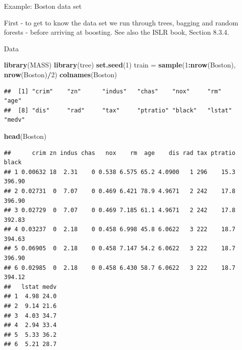 \documentclass[10pt,ignorenonframetext,]{beamer}
\newenvironment{Shaded}{\begin{snugshade}}{\end{snugshade}}
\newcommand{\KeywordTok}[1]{\textcolor[rgb]{0.13,0.29,0.53}{\textbf{#1}}}
\newcommand{\DecValTok}[1]{\textcolor[rgb]{0.00,0.00,0.81}{#1}}
\newcommand{\StringTok}[1]{\textcolor[rgb]{0.31,0.60,0.02}{#1}}
\newcommand{\OperatorTok}[1]{\textcolor[rgb]{0.81,0.36,0.00}{\textbf{#1}}}
\newcommand{\NormalTok}[1]{#1}
\begin{document}
\begin{frame}[fragile]{Example: Boston data set}

First - to get to know the data set we run through trees, bagging and
random forests - before arriving at boosting. See also the ISLR book,
Section 8.3.4.

\begin{block}{Data}

\begin{Shaded}
\begin{Highlighting}[]
\KeywordTok{library}\NormalTok{(MASS)}
\KeywordTok{library}\NormalTok{(tree)}
\KeywordTok{set.seed}\NormalTok{(}\DecValTok{1}\NormalTok{)}
\NormalTok{train =}\StringTok{ }\KeywordTok{sample}\NormalTok{(}\DecValTok{1}\OperatorTok{:}\KeywordTok{nrow}\NormalTok{(Boston), }\KeywordTok{nrow}\NormalTok{(Boston)}\OperatorTok{/}\DecValTok{2}\NormalTok{)}
\KeywordTok{colnames}\NormalTok{(Boston)}
\end{Highlighting}
\end{Shaded}

\begin{verbatim}
##  [1] "crim"    "zn"      "indus"   "chas"    "nox"     "rm"      "age"    
##  [8] "dis"     "rad"     "tax"     "ptratio" "black"   "lstat"   "medv"
\end{verbatim}

\begin{Shaded}
\begin{Highlighting}[]
\KeywordTok{head}\NormalTok{(Boston)}
\end{Highlighting}
\end{Shaded}

\begin{verbatim}
##      crim zn indus chas   nox    rm  age    dis rad tax ptratio  black
## 1 0.00632 18  2.31    0 0.538 6.575 65.2 4.0900   1 296    15.3 396.90
## 2 0.02731  0  7.07    0 0.469 6.421 78.9 4.9671   2 242    17.8 396.90
## 3 0.02729  0  7.07    0 0.469 7.185 61.1 4.9671   2 242    17.8 392.83
## 4 0.03237  0  2.18    0 0.458 6.998 45.8 6.0622   3 222    18.7 394.63
## 5 0.06905  0  2.18    0 0.458 7.147 54.2 6.0622   3 222    18.7 396.90
## 6 0.02985  0  2.18    0 0.458 6.430 58.7 6.0622   3 222    18.7 394.12
##   lstat medv
## 1  4.98 24.0
## 2  9.14 21.6
## 3  4.03 34.7
## 4  2.94 33.4
## 5  5.33 36.2
## 6  5.21 28.7
\end{verbatim}

\end{block}

\end{frame}
\end{document}
